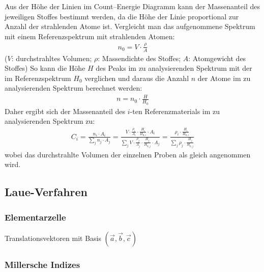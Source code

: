 \documentclass[10pt, a4paper]{article}
\begin{document}
Aus der Höhe der Linien im Count--Energie Diagramm kann der Massenanteil des jeweiligen Stoffes bestimmt werden, da die Höhe der Linie proportional zur Anzahl der strahlenden Atome ist.
Vergleicht man das aufgenommene Spektrum mit einem Referenzspektrum mit strahlenden Atomen:
\begin{align}
  n_0 = V \cdot \frac{\rho}{A}
\end{align}
($V$: durchstrahltes Volumen; $\rho$: Massendichte des Stoffes; $A$: Atomgewicht des Stoffes)
So kann die Höhe $H$ des Peaks im zu analysierenden Spektrum mit der im Referenzspektrum $H_0$ verglichen und daraus die Anzahl $n$ der Atome im zu analysierenden Spektrum berechnet werden:
\begin{align}
  n = n_0 \cdot \frac{H}{H_0}
\end{align}
Daher ergibt sich der Massenanteil des $i$-ten Referenzmaterials im zu analysierenden Spektrum zu:
\begin{align}
  C_i = \frac{n_i \cdot A_i}{\sum_j n_j \cdot A_j} = \frac{V \cdot \frac{\rho_i}{A_i} \cdot \frac{H_i}{H_{0,i}} \cdot A_i}{\sum_j V \cdot \frac{\rho_j}{A_j} \cdot \frac{H_j}{H_{0,j}}\cdot A_j} = \frac{\rho_i \cdot \frac{H_i}{H_{0,i}}}{\sum_j \rho_j \cdot \frac{H_j}{H_{0,j}}}
\end{align}
wobei das durchstrahlte Volumen der einzelnen Proben als gleich angenommen wird.

\subsection{Laue-Verfahren}

\subsubsection{Elementarzelle}
Translationsvektoren mit Basis $(\vec{a}, \vec{b}, \vec{c})$

\subsubsection{Millersche Indizes}
\end{document}
